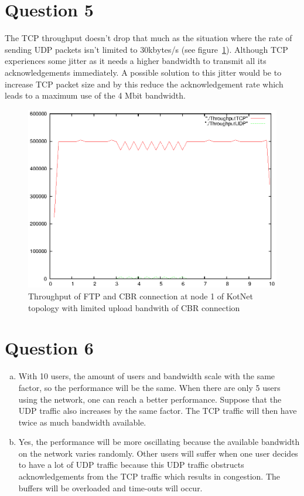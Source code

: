 \documentclass[a4paper]{report}
\begin{document}
\section*{Question 5}
The TCP throughput doesn't drop that much as the situation where the rate of sending UDP packets isn't limited to 30kbytes/s (see figure~\ref{ex1:question5}). Although TCP experiences some jitter as it needs a higher bandwidth to transmit all its acknowledgements immediately. A possible solution to this jitter would be to increase TCP packet size and by this reduce the acknowledgement rate which leads to a maximum use of the 4 Mbit bandwidth.
\begin{figure}[h]
\centerline{\includegraphics{pictures/E1Q5.eps}}
\caption{Throughput of FTP and CBR connection at node 1 of KotNet topology with limited upload bandwith of CBR connection}
\label{ex1:question5}
\end{figure}

\section*{Question 6}
\begin{enumerate}[a)]
\item
With 10 users, the amount of users and bandwidth scale with the same factor, so the performance will be the same.
When there are only 5 users using the network, one can reach a better performance. Suppose that the UDP traffic also increases by the same factor. The TCP traffic will then have twice as much bandwidth available.
\item
Yes, the performance will be more oscillating because the available bandwidth on the network varies randomly. Other users will suffer when one user decides to have a lot of UDP traffic because this UDP traffic obstructs acknowledgements from the TCP traffic which results in congestion. The buffers will be overloaded and time-outs will occur.
\end{enumerate}
\end{document}
